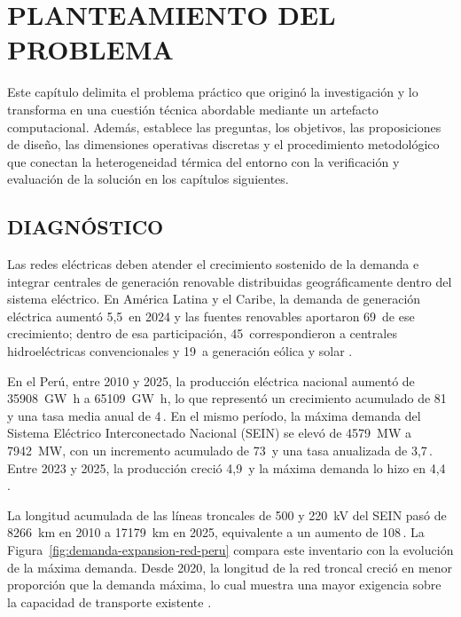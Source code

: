 \chapter{PLANTEAMIENTO DEL PROBLEMA}
\label{ch:planteamiento}
\thispagestyle{empty}

Este capítulo delimita el problema práctico que originó la investigación y lo transforma en una cuestión técnica abordable mediante un artefacto computacional. Además, establece las preguntas, los objetivos, las proposiciones de diseño, las dimensiones operativas discretas y el procedimiento metodológico que conectan la heterogeneidad térmica del entorno con la verificación y evaluación de la solución en los capítulos siguientes.

\section{DIAGNÓSTICO}
\label{sec:diagnostico}

Las redes eléctricas deben atender el crecimiento sostenido de la demanda e integrar centrales de generación renovable distribuidas geográficamente dentro del sistema eléctrico. En América Latina y el Caribe, la demanda de generación eléctrica aumentó 5,5\,\pct{} en 2024 y las fuentes renovables aportaron 69\,\pct{} de ese crecimiento; dentro de esa participación, 45\,\pct{} correspondieron a centrales hidroeléctricas convencionales y 19\,\pct{} a generación eólica y solar \parencite{olade2025generacionALC2024}.

En el Perú, entre 2010 y 2025, la producción eléctrica nacional aumentó de \SI{35908}{\giga\watt\hour} a \SI{65109}{\giga\watt\hour}, lo que representó un crecimiento acumulado de 81\,\pct{} y una tasa media anual de 4\,\pct{}. En el mismo período, la máxima demanda del Sistema Eléctrico Interconectado Nacional (SEIN) se elevó de \SI{4579}{\mega\watt} a \SI{7942}{\mega\watt}, con un incremento acumulado de 73\,\pct{} y una tasa anualizada de 3,7\,\pct{}. Entre 2023 y 2025, la producción creció 4,9\,\pct{} y la máxima demanda lo hizo en 4,4\,\pct{} \parencites[sec.~10.4]{minem2025anuario2024}[cuadro~4]{minem2025indicadoresDiciembre}{coesMaximaDemanda}.

La longitud acumulada de las líneas troncales de 500 y \SI{220}{\kilo\volt} del SEIN pasó de \SI{8266}{\kilo\metre} en 2010 a \SI{17179}{\kilo\metre} en 2025, equivalente a un aumento de 108\,\pct{}. La Figura~\ref{fig:demanda-expansion-red-peru} compara este inventario con la evolución de la máxima demanda. Desde 2020, la longitud de la red troncal creció en menor proporción que la demanda máxima, lo cual muestra una mayor exigencia sobre la capacidad de transporte existente \parencites{coesEstadisticasAnuales}{coesMaximaDemanda}.


